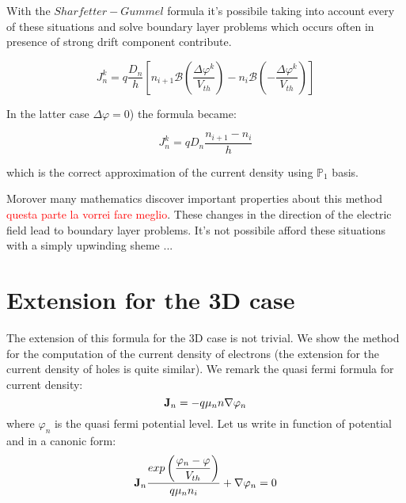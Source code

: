 \begin{center}


\end{center}


With the $Sharfetter-Gummel$ formula it's possibile taking into account every of these situations and solve boundary layer problems which occurs often in presence of strong drift component contribute.

 \begin{equation}
\label{eq: scharfetter gummel 1D electron}
J_n^k=q\frac{D_n}{h}
\left[ n_{i+1}\mathcal{B}\left(\frac{\Delta \varphi^k}{V_{th}}\right)- n_i\mathcal{B}\left(-\frac{\Delta \varphi^k}{V_{th}}\right)\right]  
\end{equation}

In the latter case $\Delta \varphi=0$) the formula became:

\begin{equation}
J_n^k=qD_n\frac{n_{i+1}-n_{i}}{h}
\end{equation}

which is the correct approximation of the current density using $\mathbb{P}_1$ basis. 

Morover many mathematics discover important properties about this method \textcolor{red}{questa parte la vorrei fare meglio}. 
These changes in the direction of the electric field lead to boundary layer problems. It's not possibile afford these situations with a simply upwinding sheme ...

\section{Extension for the 3D case}
 
The extension of this formula for the 3D case is not trivial. We show the method for the computation of the current density of electrons (the extension for the current density of holes is quite similar).
We remark the quasi fermi formula for current density:
\begin{equation}
\label{eq: current density fermi}
\mathbf{J}_n=-q \mu_n n \nabla \varphi_n
\end{equation}
where $\varphi_n$ is the quasi fermi potential level. Let us write  in function of potential and in a canonic form:
\begin{equation}
\label{eq: current density canonic form}
\mathbf{J}_n\dfrac{ exp\left(\dfrac{\varphi_n-\varphi}{V_{th}}\right)}{q \mu_n n_i} + \nabla \varphi_n = 0
\end{equation}

